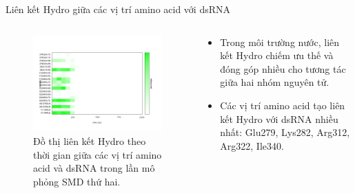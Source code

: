 \documentclass[10pt]{beamer}
\begin{document}
	\begin{frame}{Liên kết Hydro giữa các vị trí amino acid với dsRNA}
		\label{fig:hbond}
	\begin{columns}
	\begin{column}{0.5\textwidth}
		\begin{figure}[h]
		\centering
		\includegraphics[width=\textwidth,natwidth=610,natheight=642]{../hbond3L25_pull2}
		\caption{Đồ thị liên kết Hydro theo thời gian giữa các vị trí amino acid và dsRNA trong lần mô phỏng SMD thứ hai.}
		\end{figure}
	\end{column}
	
	\begin{column}{0.5\textwidth}
		\begin{itemize}
		\item Trong môi trường nước, liên kết Hydro chiếm ưu thế và đóng góp nhiều cho tương tác giữa hai nhóm nguyên tử.
		\item Các vị trí amino acid tạo liên kết Hydro với dsRNA nhiều nhất: Glu279, Lys282, Arg312, Arg322, Ile340.
		\end{itemize}
	\end{column}
	\end{columns}
	\end{frame}
\end{document}
